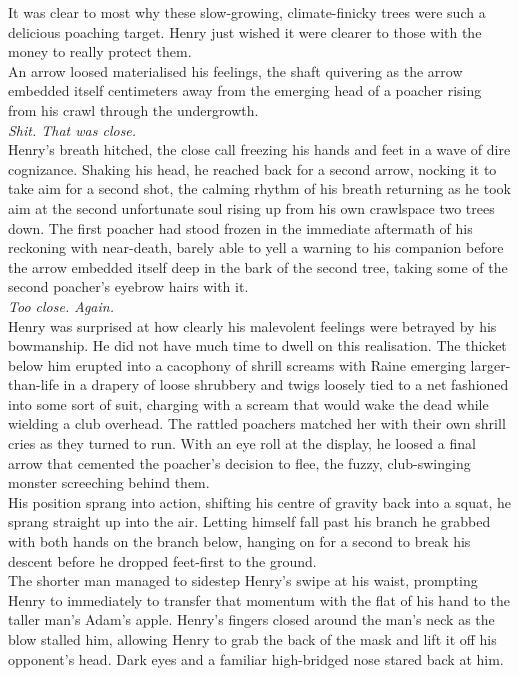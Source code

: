 It was clear to most why these slow-growing, climate-finicky trees were such a delicious poaching target.
Henry just wished it were clearer to those with the money to really protect them.\\

An arrow loosed materialised his feelings, the shaft quivering as the arrow embedded itself centimeters away from the emerging head of a poacher rising from his crawl through the undergrowth.\\

\textit{Shit. That was close.}\\

Henry's breath hitched, the close call freezing his hands and feet in a wave of dire cognizance.
Shaking his head, he reached back for a second arrow, nocking it to take aim for a second shot, the calming rhythm of his breath returning as he took aim at the second unfortunate soul rising up from his own crawlspace two trees down.
The first poacher had stood frozen in the immediate aftermath of his reckoning with near-death, barely able to yell a warning to his companion before the arrow embedded itself deep in the bark of the second tree, taking some of the second poacher's eyebrow hairs with it.\\

\textit{Too close. Again.}\\

Henry was surprised at how clearly his malevolent feelings were betrayed by his bowmanship.
He did not have much time to dwell on this realisation. 
The thicket below him erupted into a cacophony of shrill screams with Raine emerging larger-than-life in a drapery of loose shrubbery and twigs loosely tied to a net fashioned into some sort of suit, charging with a scream that would wake the dead while wielding a club overhead.
The rattled poachers matched her with their own shrill cries as they turned to run.
With an eye roll at the display, he loosed a final arrow that cemented the poacher's decision to flee, the fuzzy, club-swinging monster screeching behind them.\\

His position sprang into action, shifting his centre of gravity back into a squat, he sprang straight up into the air.
Letting himself fall past his branch he grabbed with both hands on the branch below, hanging on for a second to break his descent before he dropped feet-first to the ground.\\

The shorter man managed to sidestep Henry's swipe at his waist, prompting Henry to immediately to transfer that momentum with the flat of his hand to the taller man's Adam's apple.
Henry's fingers closed around the man's neck as the blow stalled him, allowing Henry to grab the back of the mask and lift it off his opponent's head. Dark eyes and a familiar high-bridged nose stared back at him.\\


